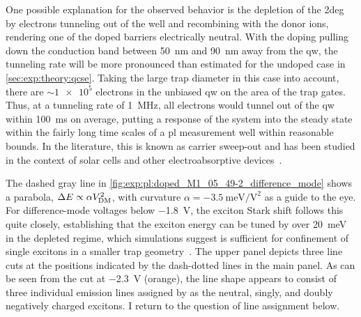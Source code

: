 One possible explanation for the observed behavior is the depletion of the \gls{2deg} by electrons tunneling out of the well and recombining with the donor ions, rendering one of the doped barriers electrically neutral.
With the doping pulling down the conduction band between \qty{50}{\nano\meter} and \qty{90}{\nano\meter} away from the \gls{qw}, the tunneling rate will be more pronounced than estimated for the undoped case in \cref{sec:exp:theory:qcse}.
Taking the large trap diameter in this case into account, there are $\sim\num{1e5}$ electrons in the unbiased \gls{qw} on the area of the trap gates.
Thus, at a tunneling rate of \qty{1}{\mega\hertz}, all electrons would tunnel out of the \gls{qw} within \qty{100}{\milli\second} on average, putting a response of the system into the steady state within the fairly long time scales of a \gls{pl} measurement
well within reasonable bounds.
In the literature, this is known as carrier sweep-out and has been studied in the context of solar cells and other electroabsorptive devices~\cite{Larsson1988,Schneider1988,Fox1991}.

The dashed gray line in \cref{fig:exp:pl:doped_M1_05_49-2_difference_mode} shows a parabola, $\Delta E\propto \alpha V_{\mathrm{DM}}^2$, with curvature $\alpha = \qty{-3.5}{\milli\electronvolt\per\volt\squared}$ as a guide to the eye.
For difference-mode voltages below \qty{-1.8}{\volt}, the exciton Stark shift follows this quite closely, establishing that the exciton energy can be tuned by over \qty{20}{\milli\electronvolt} in the depleted regime, which simulations suggest is sufficient for confinement of single excitons in a smaller trap geometry~\cite{Descamps2021}.
The upper panel depicts three line cuts at the positions indicated by the dash-dotted lines in the main panel.
As can be seen from the cut at \qty{-2.3}{\volt} (orange), the line shape appears to consist of three individual emission lines assigned by \textcite{Descamps2021} as the neutral, singly, and doubly negatively charged excitons. %
I return to the question of line assignment below.


